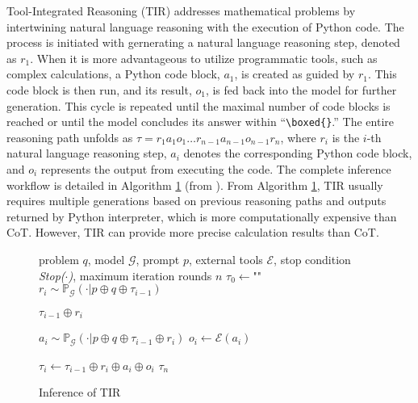 Tool-Integrated Reasoning (TIR) addresses mathematical problems by intertwining natural language reasoning with the execution of Python code. 
The process is initiated with gernerating a natural language reasoning step, denoted as $r_1$. 
When it is more advantageous to utilize programmatic tools, such as complex calculations, a Python code block, $a_1$, is created as guided by $r_1$. 
This code block is then run, and its result, $o_1$, is fed back into the model for further generation. 
This cycle is repeated until the maximal number of code blocks is reached or until the model concludes its answer within ``\lstinline|\boxed{}|.'' 
The entire reasoning path unfolds as $\tau = r_1 a_1 o_1 \dots r_{n-1} a_{n-1} o_{n-1} r_n$, where $r_i$ is the $i$-th natural language reasoning step, $a_i$ denotes the corresponding Python code block, and $o_i$ represents the output from executing the code. 
The complete inference workflow is detailed in Algorithm \ref{alg:interleave} (from \citet{tora2023Gou}).
From Algorithm \ref{alg:interleave}, TIR usually requires multiple generations based on previous reasoning paths and outputs returned by Python interpreter, which is more computationally expensive than CoT.
However, TIR can provide more precise calculation results than CoT.

\begin{figure}[thbp]
\begin{algorithm}[H]
\small
\begin{algorithmic}[1]
\Require problem $q$, model $\mathcal{G}$, prompt ${p}$, external tools $\mathcal{E}$, stop condition \textit{Stop($\cdot$)}, maximum iteration rounds $n$
\State $\tau_{0} \leftarrow \text{""}$ 
\State $r_{i}\sim \mathbb{P}_{\mathcal{G}}(\cdot|p\oplus q\oplus \tau_{i-1})$ 

 
\State \Return $\tau_{i-1}\oplus r_i$
\EndIf

\State $a_i \sim \mathbb{P}_{\mathcal{G}}(\cdot|p\oplus q\oplus \tau_{i-1}\oplus r_i)$ 
\State $o_{i} \leftarrow \mathcal{E}(a_i)$ 

\State $\tau_{i} \leftarrow \tau_{i-1}\oplus r_{i}\oplus a_i\oplus o_{i}$ 
\EndFor
\State \Return $\tau_{n}$
\end{algorithmic}
\caption{Inference of TIR}
\label{alg:interleave}
\end{algorithm}
\end{figure}



